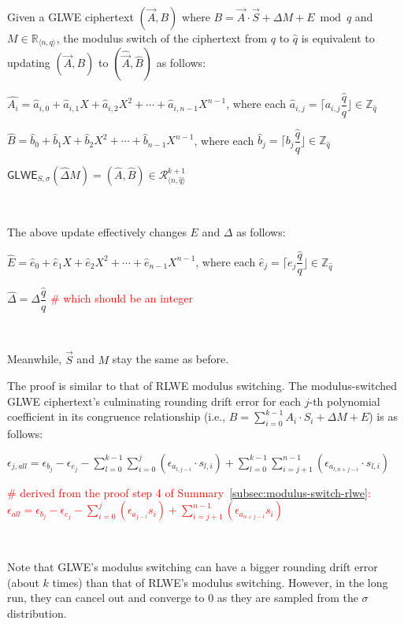 \begin{tcolorbox}[title={\textbf{\tboxlabel{\ref*{subsec:modulus-switch-glwe}} GLWE Modulus Switching}}]

Given a GLWE ciphertext $(\vec A, B)$ where $B = \vec A\cdot \vec S + \Delta M + E \bmod q$ and $M \in \mathbb{R}_{\langle n, q \rangle}$, the modulus switch of the ciphertext from $q$ to $\hat q$ is equivalent to updating $(\vec A, B)$ to $(\hat{\vec A}, \hat B)$ as follows:


$\hat{A_i} = \hat{a}_{i,0} + \hat{a}_{i,1}X + \hat{a}_{i,2}X^2 + \cdots + \hat{a}_{i, {n-1}}X^{n-1}$, where each $\hat{a}_{i,j} = \Big\lceil a_{i,j}\dfrac{\hat{q}}{q} \Big\rfloor \in \mathbb{Z}_{\hat{q}}$ 


$\hat{B} = \hat{b}_0 + \hat{b}_1X + \hat{b}_2X^2 + \cdots + \hat{b}_{n-1}X^{n-1}$, where each $\hat{b}_j = \Big\lceil b_j\dfrac{\hat{q}}{q} \Big\rfloor \in \mathbb{Z}_{\hat{q}}$

$\textsf{GLWE}_{{S},\sigma}(\hat{\Delta}  M) = (\hat{A}, \hat{B}) \in \mathcal{R}_{\langle n, \hat{q} \rangle}^{k+1}$ 

$ $

The above update effectively changes $E$ and $\Delta$ as follows:

$\hat{E} = \hat{e}_0 + \hat{e}_1X + \hat{e}_2X^2 + \cdots + \hat{e}_{n-1}X^{n-1}$, where each $\hat{e}_j = \Big\lceil e_j\dfrac{\hat{q}}{q} \Big\rfloor \in \mathbb{Z}_{\hat{q}}$


$\hat{\Delta} = \Delta\dfrac{\hat{q}}{q}$ \textcolor{red}{\# which should be an integer}

$ $


Meanwhile, $\vec{S}$ and $M$ stay the same as before.



\end{tcolorbox}

The proof is similar to that of RLWE modulus switching. The modulus-switched GLWE ciphertext's culminating rounding drift error for each $j$-th polynomial coefficient in its congruence relationship (i.e., $B = \sum\limits_{i=0}^{k-1}A_i\cdot S_i + \Delta M + E$) is as follows:

$\epsilon_{j, all} = \epsilon_{b_j} - \epsilon_{e_j}
- \sum\limits_{l=0}^{k-1}\sum\limits_{i=0}^{j}(\epsilon_{a_{l,j-i}} \cdot s_{l,i})
+ \sum\limits_{l=0}^{k-1}\sum\limits_{i=j+1}^{n-1}(\epsilon_{a_{l,n+j-i}} \cdot s_{l,i})$

\textcolor{red}{ \# derived from the proof step 4 of Summary~\ref*{subsec:modulus-switch-rlwe}: $\epsilon_{all} = \epsilon_{b_j} - \epsilon_{e_j}
- \sum\limits_{i=0}^{j}(\epsilon_{a_{j-i}} s_i)
+ \sum\limits_{i=j+1}^{n-1}(\epsilon_{a_{n+j-i}} s_i)$}

$ $

Note that GLWE's modulus switching can have a bigger rounding drift error (about $k$ times) than that of RLWE's modulus switching. However, in the long run, they can cancel out and converge to 0 as they are sampled from the $\sigma$ distribution.